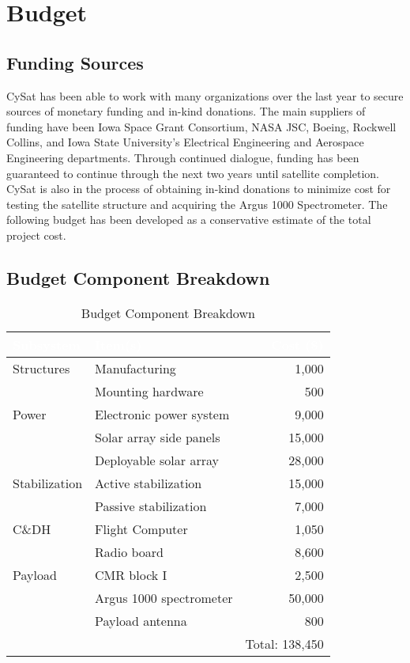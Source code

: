 \documentclass[nocover]            %
{CSLI}                       %
\begin{document}
\section{Budget}
\subsection{Funding Sources}
CySat has been able to work with many organizations over the last year to secure sources of monetary funding and in-kind donations. The main suppliers of funding have been Iowa Space Grant Consortium, NASA JSC, Boeing, Rockwell Collins, and Iowa State University's Electrical Engineering and Aerospace Engineering departments. Through continued dialogue, funding has been guaranteed to continue through the next two years until satellite completion. CySat is also in the process of obtaining in-kind donations to minimize cost for testing the satellite structure and acquiring the Argus 1000 Spectrometer. The following budget has been developed as a conservative estimate of the total project cost.
\subsection{Budget Component Breakdown}
\begin{table}[H]
\centering
\caption{Budget Component Breakdown}
\begin{tabular}{| l | p{5cm} | r |}
\arrayrulecolor{white}
\hline
\rowcolor{gray!80}
\textcolor{white}{\textbf{Subsystem}} & \textcolor{white}{\textbf{Item(s)}} &  \textcolor{white}{\textbf{Cost (\$)}} \\ \hline
\rowcolor{gray!10}
Structures & Manufacturing&1,000 \\
\rowcolor{gray!10}
 &Mounting hardware &500 \\ \hline
\rowcolor{gray!5}
Power & Electronic power system & 9,000\\
\rowcolor{gray!5}
& Solar array side panels &15,000 \\
\rowcolor{gray!5}
& Deployable solar array & 28,000\\ \hline
\rowcolor{gray!10}
Stabilization & Active stabilization&15,000 \\
\rowcolor{gray!10}
&Passive stabilization &7,000 \\ \hline
\rowcolor{gray!5}
C\&DH& Flight Computer &1,050\\
\rowcolor{gray!5}
& Radio board& 8,600\\ \hline
\rowcolor{gray!10}
Payload & CMR block I &2,500 \\
\rowcolor{gray!10}
& Argus 1000 spectrometer &50,000 \\
\rowcolor{gray!10}
& Payload antenna & 800\\\hline
\rowcolor{gray!5}
 &  & Total: 138,450\\ \hline
\end{tabular}
\end{table}
\end{document}
